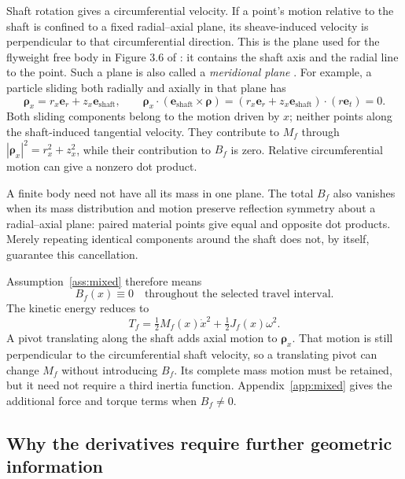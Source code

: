 \documentclass[11pt,letterpaper]{article}
\numberwithin{equation}{section}
\newcommand{\e}{\bm e_{\mathrm{shaft}}}
\newcommand{\rhoo}{\bm\rho}
\newcommand{\half}{\tfrac12}
\newcommand{\source}{\cite{formulation}}
\begin{document}
Shaft rotation gives a circumferential velocity. If a point's motion relative to the shaft is confined to a fixed radial--axial plane, its sheave-induced velocity is perpendicular to that circumferential direction. This is the plane used for the flyweight free body in Figure 3.6 of \source: it contains the shaft axis and the radial line to the point. Such a plane is also called a \emph{meridional plane} \cite{katsanis}. For example, a particle sliding both radially and axially in that plane has
\begin{equation}
  \rhoo_x=r_x\bm e_r+z_x\e,
  \qquad
  \rhoo_x\cdot(\e\times\rhoo)
     =(r_x\bm e_r+z_x\e)\cdot(r\bm e_t)=0.
  \label{eq:meridional-dot}
\end{equation}
Both sliding components belong to the motion driven by $x$; neither points along the shaft-induced tangential velocity. They contribute to $M_f$ through $|\rhoo_x|^2=r_x^2+z_x^2$, while their contribution to $B_f$ is zero. Relative circumferential motion can give a nonzero dot product.

A finite body need not have all its mass in one plane. The total $B_f$ also vanishes when its mass distribution and motion preserve reflection symmetry about a radial--axial plane: paired material points give equal and opposite dot products. Merely repeating identical components around the shaft does not, by itself, guarantee this cancellation.

Assumption~\ref{ass:mixed} therefore means
\begin{equation}
  B_f(x)\equiv0
  \quad\text{throughout the selected travel interval}.
  \label{eq:Bzero}
\end{equation}
The kinetic energy reduces to
\begin{equation}
  \boxed{T_f=\half M_f(x)\dot x^2+\half J_f(x)\omega^2.}
  \label{eq:reduced-energy}
\end{equation}
A pivot translating along the shaft adds axial motion to $\rhoo_x$. That motion is still perpendicular to the circumferential shaft velocity, so a translating pivot can change $M_f$ without introducing $B_f$. Its complete mass motion must be retained, but it need not require a third inertia function. Appendix~\ref{app:mixed} gives the additional force and torque terms when $B_f\ne0$.

\subsection{Why the derivatives require further geometric information}
\end{document}
